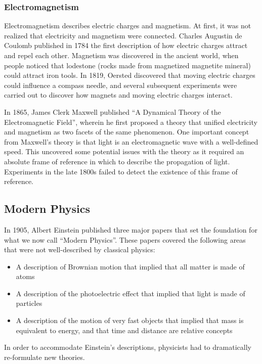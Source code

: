 \subsubsection{Electromagnetism}
Electromagnetism describes electric charges and magnetism. At first, it was not realized that electricity and magnetism were connected. Charles Augustin de Coulomb published in 1784 the first description of how electric charges attract and repel each other. Magnetism was discovered in the ancient world, when people noticed that lodestone (rocks made from magnetized magnetite mineral) could attract iron tools. In 1819, Oersted discovered that moving electric charges could influence a compass needle, and several subsequent experiments were carried out to discover how magnets and moving electric charges interact.

In 1865, James Clerk Maxwell published ``A Dynamical Theory of the Electromagnetic Field'', wherein he first proposed a theory that unified electricity and magnetism as two facets of the same phenomenon. One important concept from Maxwell's theory is that light is an electromagnetic wave with a well-defined speed. This uncovered some potential issues with the theory as it required an absolute frame of reference in which to describe the propagation of light. Experiments in the late 1800s failed to detect the existence of this frame of reference.

\subsection{Modern Physics}
In 1905, Albert Einstein published three major papers that set the foundation for what we now call ``Modern Physics''. These papers covered the following areas that were not well-described by classical physics:
\begin{itemize}
\item A description of Brownian motion that implied that all matter is made of atoms
\item A description of the photoelectric effect that implied that light is made of particles
\item A description of the motion of very fast objects that implied that mass is equivalent to energy, and that time and distance are relative concepts
\end{itemize}
In order to accommodate Einstein's descriptions, physicists had to dramatically re-formulate new theories. 

